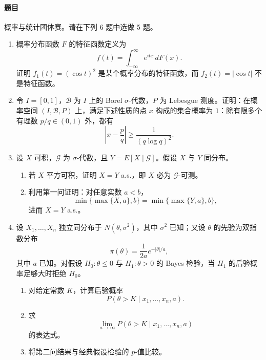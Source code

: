 \documentclass[UTF8,12pt]{ctexart}
\begin{document}
\paragraph{题目}
概率与统计团体赛。请在下列 6 题中选做 5 题。
\begin{enumerate}[label=\textbf{\arabic*.},leftmargin=2.2em]
\item 概率分布函数 \(F\) 的特征函数定义为
\[
f(t)=\int_{-\infty}^{\infty} e^{itx}\,dF(x).
\]
证明 \(f_1(t)=(\cos t)^2\) 是某个概率分布的特征函数，而 \(f_2(t)=|\cos t|\) 不是特征函数。

\item 令 \(I=[0,1]\)，\(\mathcal B\) 为 \(I\) 上的 Borel \(\sigma\)-代数，\(P\) 为 Lebesgue 测度。证明：在概率空间 \((I,\mathcal B,P)\) 上，满足下述性质的点 \(x\) 构成的集合概率为 \(1\)：除有限多个有理数 \(p/q\in(0,1)\) 外，都有
\[
\left|x-\frac pq\right|\ge \frac1{(q\log q)^2}.
\]

\item 设 \(X\) 可积，\(\mathcal G\) 为 \(\sigma\)-代数，且 \(Y=E[X\mid\mathcal G]\)。假设 \(X\) 与 \(Y\) 同分布。
\begin{enumerate}[label=\textbf{(\arabic*)},leftmargin=2.4em]
\item 若 \(X\) 平方可积，证明 \(X=Y\) a.s.，即 \(X\) 必为 \(\mathcal G\)-可测。
\item 利用第一问证明：对任意实数 \(a<b\)，
\[
\min\{\max\{X,a\},b\}=\min\{\max\{Y,a\},b\},
\]
进而 \(X=Y\) a.s.。
\end{enumerate}

\item 设 \(X_1,\ldots,X_n\) 独立同分布于 \(N(\theta,\sigma^2)\)，其中 \(\sigma^2\) 已知；又设 \(\theta\) 的先验为双指数分布
\[
\pi(\theta)=\frac1{2a}e^{-|\theta|/a},
\]
其中 \(a\) 已知。对假设 \(H_0:\theta\le0\) 与 \(H_1:\theta>0\) 的 Bayes 检验，当 \(H_1\) 的后验概率足够大时拒绝 \(H_0\)。
\begin{enumerate}[label=\textbf{(\alph*)},leftmargin=2.4em]
\item 对给定常数 \(K\)，计算后验概率
\[
P(\theta>K\mid x_1,\ldots,x_n,a).
\]
\item 求
\[
\lim_{a\to\infty}P(\theta>K\mid x_1,\ldots,x_n,a)
\]
的表达式。
\item 将第二问结果与经典假设检验的 \(p\)-值比较。
\end{enumerate}


\end{enumerate}
\end{document}
